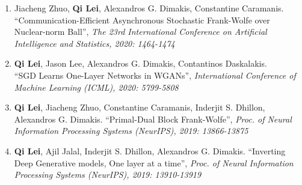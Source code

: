 \documentclass[margin, 10pt]{res} %
\begin{document}
\begin{resume}
\begin{enumerate}
\item{Jiacheng Zhuo, \textbf{Qi Lei}, Alexandros G. Dimakis, Constantine 
      Caramanis.\\ ``Communication-Efficient Asynchronous Stochastic 
    Frank-Wolfe over Nuclear-norm Ball'', \textit{The 23rd International Conference on Artificial Intelligence and Statistics, 2020: 1464-1474} }
\item{\textbf{Qi Lei}, Jason Lee, Alexandros G. Dimakis, Contantinos 
  Daskalakis. \\ ``SGD Learns One-Layer Networks in WGANs'', 
    \textit{International Conference of Machine Learning (ICML), 2020: 5799-5808}}
  \item{ \textbf{Qi Lei}, Jiacheng Zhuo, Constantine Caramanis, Inderjit S. 
    Dhillon, Alexandros G. Dimakis. ``Primal-Dual Block Frank-Wolfe'', 
  \textit{Proc. of Neural Information Processing Systems (NeurIPS), 2019: 13866-13875} }
  \item{ \textbf{Qi Lei}, Ajil Jalal, Inderjit S. Dhillon, Alexandros G. 
      Dimakis. ``Inverting Deep Generative models, One layer at a time'', 
    \textit{Proc. of Neural Information Processing Systems (NeurIPS), 2019: 13910-13919} }


\end{enumerate}
\end{resume}
\end{document}

